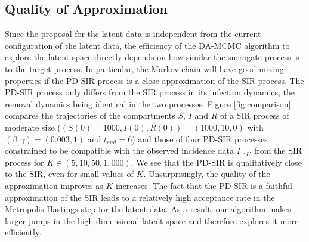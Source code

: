 \documentclass[11pt]{article}
\begin{document}
	\subsection{Quality of Approximation}
	\label{sec:qua}
	
	Since the proposal for the latent data is independent from the current configuration of the latent data, the efficiency of the DA-MCMC algorithm to explore the latent space directly depends on how similar the surrogate process is to the target process. In particular, the Markov chain will have good mixing properties if the PD-SIR process is a close approximation of the SIR process. The PD-SIR process only differs from the SIR process in its infection dynamics, the removal dynamics being identical in the two processes. Figure \ref{fig:comparison} compares the trajectories of the compartments $S$, $I$ and $R$ of a SIR process of moderate size ($(S(0) = 1000, I(0), R(0)) = (1000, 10, 0)$ with $(\beta, \gamma) = (0.003, 1)$ and $t_{end} = 6$) and those of four PD-SIR processes constrained to be compatible with the observed incidence data $I_{1:K}$ from the SIR process for $K \in (5, 10, 50, 1,000)$. We see that the PD-SIR is qualitatively close to the SIR, even for small values of $K$. Unsurprisingly, the quality of the approximation improves as $K$ increases.
	The fact that the PD-SIR is a faithful approximation of the SIR leads to a relatively high acceptance rate in the Metropolis-Hastings step for the latent data. As a result, our algorithm makes larger jumps in the high-dimensional latent space and therefore explores it more efficiently.
	
\end{document}
